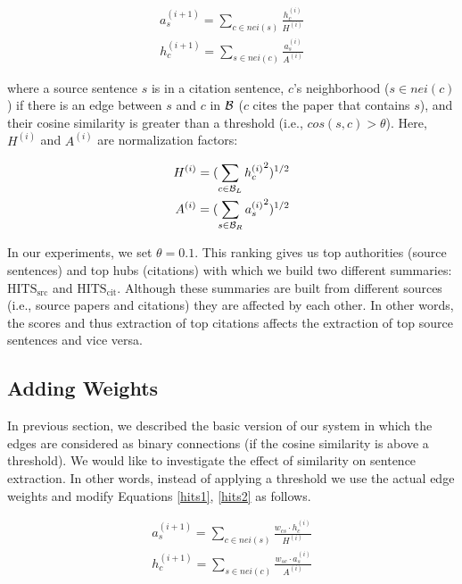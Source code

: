 {\small
\begin{eqnarray}
\label{hits1} a^{(i+1)}_s = \sum_{c\in nei(s)} \frac{h^{(i)}_c}{H^{(i)}}
\end{eqnarray}
}
{\small
\begin{eqnarray}
\label{hits2} h^{(i+1)}_c = \sum_{s\in nei(c)} \frac{a^{(i)}_s}{A^{(i)}}
\end{eqnarray}
}

where a source sentence $s$ is in a citation sentence, $c$'s neighborhood ($s\in nei(c)$) if there is an edge between $s$ and $c$ in $\B$ ($c$ cites the paper that contains $s$), and their cosine similarity is greater than a threshold (i.e., $cos(s,c) > \theta$). Here, $H^{(i)}$ and $A^{(i)}$ are normalization factors:

{\small
\begin{eqnarray}
H^{(i)} = (\sum_{c\in \B_L} {h^{(i)}_c}^2)^{1/2}\\
A^{(i)} = (\sum_{s\in \B_R} {a^{(i)}_s}^2)^{1/2}
\end{eqnarray}}

In our experiments, we set $\theta = 0.1$. This ranking gives us top authorities (source sentences) and top hubs (citations) with which we build two different summaries: {\bf $\textrm{HITS}_\textrm{src}$} and {\bf $\textrm{HITS}_\textrm{cit}$}. Although these summaries are built from different sources (i.e., source papers and citations) they are affected by each other. In other words, the scores and thus extraction of top citations affects the extraction of top source sentences and vice versa. 


\subsection{Adding Weights}
In previous section, we described the basic version of our system in which the edges are considered as binary connections (if the cosine similarity is above a threshold). We would like to investigate the effect of similarity on sentence extraction. In other words, instead of applying a threshold we use the actual edge weights and modify Equations \ref{hits1}, \ref{hits2} as follows.

{\small
\begin{eqnarray}
\label{whits1} a^{(i+1)}_s = \sum_{c\in nei(s)} \frac{w_{cs} \cdot  h^{(i)}_c}{H^{(i)}}\\
\label{whits2} h^{(i+1)}_c = \sum_{s\in nei(c)} \frac{w_{sc} \cdot a^{(i)}_s}{A^{(i)}}
\end{eqnarray}}

